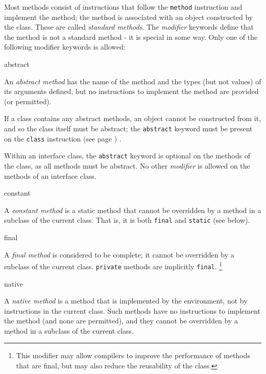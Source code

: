 Most methods consist of instructions that follow the \texttt{method}
instruction and implement the method; the method is associated with an
object constructed by the class.
These are called \emph{standard methods}.
The \emph{modifier} keywords define that the method is not a
standard method - it is special in some way.
Only one of the following modifier keywords is allowed:
\begin{description}
\item{abstract}

An \emph{abstract method} has the name of the method and the types
(but not values) of its arguments defined, but no instructions to
implement the method are provided (or permitted).
 
If a class contains any abstract methods, an object cannot be
constructed from it, and so the class itself must be abstract; the
\texttt{abstract} keyword must be present on the
 \texttt{class} instruction (see page \pageref{refclass}) .
 
Within an interface class, the \texttt{abstract} keyword is optional on
the methods of the class, as all methods must be abstract.  No other
\emph{modifier} is allowed on the methods of an interface class.
\item{constant}

A \emph{constant method} is a static method that cannot be
overridden by a method in a subclass of the current class.
That is, it is both \texttt{final} and \texttt{static} (see below).
\item{final}

A \emph{final method} is considered to be complete; it cannot be
overridden by a subclass of the current class.  \texttt{private} methods
are implicitly \texttt{final}.
\footnote{
This modifier may allow compilers to improve the performance of methods
that are final, but may also reduce the reusability of the class.
}
\item{native}

A \emph{native method} is a method that is implemented by the
environment, not by instructions in the current class.
Such methods have no \nr{} instructions to implement the method (and
none are permitted), and they cannot be overridden by a method in a
subclass of the current class.
 

\end{description}

